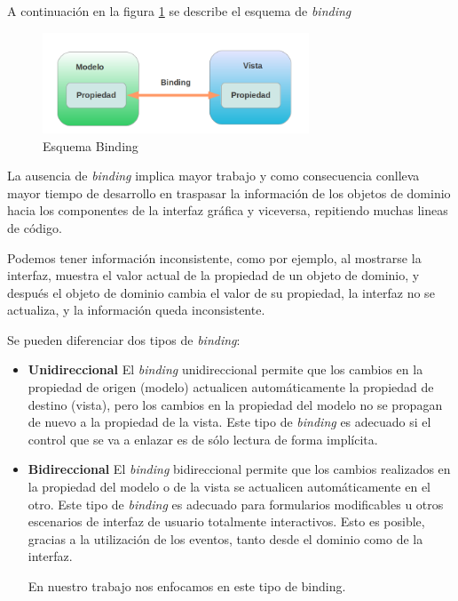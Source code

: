 	
	A continuación en la figura \ref{fig:binding} se describe el esquema de
		\emph{binding}
		
		\begin{figure}[h]
			\centering
			\includegraphics[width=300px]{img/binding}
			\caption{Esquema Binding}
			\label{fig:binding}
		\end{figure}
		
		\bigskip
	
	La ausencia de \emph{binding} implica mayor trabajo  y como consecuencia
	conlleva mayor tiempo de desarrollo en  traspasar la información de los
	objetos de dominio hacia los componentes de la interfaz gráfica y viceversa, repitiendo muchas lineas de código.
	
	Podemos tener información inconsistente, como por ejemplo, al mostrarse la interfaz,
	muestra el valor actual de la propiedad de un objeto de dominio, y después el
	objeto de dominio cambia el valor de su propiedad, la interfaz no se actualiza,
	y la información queda inconsistente.
	
	\bigskip
	
	Se pueden diferenciar dos tipos de \emph{binding}:
	
	\begin {itemize}
	
		\item {\bf Unidireccional}
		El \emph{binding} unidireccional permite que los cambios en la propiedad de
		origen (modelo) actualicen automáticamente la propiedad de destino (vista),
		pero los cambios en la propiedad del modelo no se propagan de nuevo a la
		propiedad de la vista.
		Este tipo de \emph{binding} es adecuado si el control que se va a enlazar es
		de sólo lectura de forma implícita.		
		
		\item {\bf Bidireccional}
		El \emph{binding} bidireccional permite que los cambios realizados en la
		propiedad del modelo o de la vista se actualicen automáticamente en el
		otro. Este tipo de \emph{binding} es adecuado para formularios modificables u
		otros escenarios de interfaz de usuario totalmente interactivos.
		Esto es posible, gracias a la utilización de los eventos, tanto desde el
		dominio como de la interfaz.
	
		En nuestro trabajo nos enfocamos en este tipo de binding.
		 
	
	\end {itemize}
	


